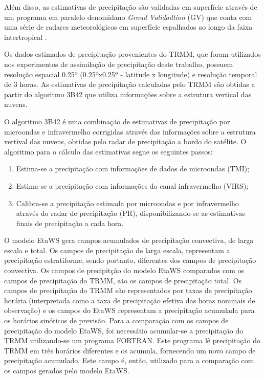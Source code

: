 Além disso, as estimativas de precipitação são validadas em superfície através de um programa em paralelo denomidano \textit{Groud Validadtion} (GV) que conta com uma série de radares meteorológicos em superfície espalhados ao longo da faixa intertropical \cite{collischonnetal07}. 

Os dados estimados de precipitação provenientes do TRMM, que foram utilizados nos experimentos de assimilação de precipitação deste trabalho, possuem resolução espacial 0.25º (0.25ºx0.25º - latitude x longitude) e resolução temporal de 3 horas. As estimativas de precipitação calculadas pelo TRMM são obtidas a partir do algoritmo 3B42 que utiliza informações sobre a estrutura vertical das nuvens.

O algoritmo 3B42 é uma combinação de estimativas de precipitação por microondas e infravermelho corrigidas através das informações sobre a estrutura vertival das nuvens, obtidas pelo radar de precipitação a bordo do satélite. O algoritmo para o cálculo das estimativas segue os seguintes passos:

\begin{enumerate}
\item Estima-se a precipitação com informações de dados de microondas (TMI);
\item Estima-se a precipitação com informações do canal infravermelho (VIRS);
\item Calibra-se a precipitação estimada por microondas e por infravermelho através do radar de precipitação (PR), disponibilizando-se as estimativas finais de precipitação a cada hora.
\end{enumerate}

O modelo EtaWS gera campos acumulados de precipitação convectiva, de larga escala e total. Os campos de precipitação de larga escala, representam a precipitação estratiforme, sendo portanto, diferentes dos campos de precipitação convectiva. Os campos de precipitção do modelo EtaWS comparados com os campos de precipitação do TRMM, são os campos de precipitação total. Os campos de precipitação do TRMM são representados por taxas de precipitação horária (interpretada como a taxa de precipitação efetiva das horas nominais de observação) e os campos do EtaWS representam a precipitação acumulada para os horários sinóticos de previsão. Para a comparação com os campos de precipitação do modelo EtaWS, foi necessátio acumular-se a precipitação do TRMM utilizando-se um programa FORTRAN. Este programa lê precipitação do TRMM em três horários diferentes e os acumula, fornecendo um novo campo de precipitação acumulado. Este campo é, então, utilizado para a comparação com os campos gerados pelo modelo EtaWS.

